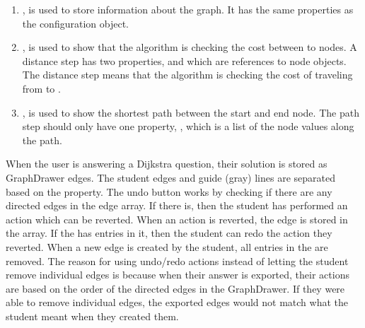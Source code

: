 \begin{enumerate}
    \item {}, is used to store information about the graph. It has the same properties as the  configuration object.
    \item {}, is used to show that the algorithm is checking the cost between to nodes. A distance step has two properties,  and  which are references to node objects. The distance step means that the algorithm is checking the cost of traveling from  to .
    \item {}, is used to show the shortest path between the start and end node. The path step should only have one property, , which is a list of the node values along the path.
\end{enumerate}
When the user is answering a Dijkstra question, their solution is stored as GraphDrawer edges. The student edges and guide (gray) lines are separated based on the  property. The undo button works by checking if there are any directed edges in the edge array. If there is, then the student has performed an action which can be reverted. When an action is reverted, the edge is stored in the  array. If the  has entries in it, then the student can redo the action they reverted. When a new edge is created by the student, all entries in the  are removed. The reason for using undo/redo actions instead of letting the student remove individual edges is because when their answer is exported, their actions are based on the order of the directed edges in the GraphDrawer. If they were able to remove individual edges, the exported edges would not match what the student meant when they created them.
